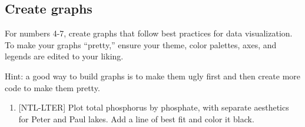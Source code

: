 \documentclass[]{article}
\newenvironment{Shaded}{\begin{snugshade}}{\end{snugshade}}
\newcommand{\KeywordTok}[1]{\textcolor[rgb]{0.13,0.29,0.53}{\textbf{#1}}}
\newcommand{\DataTypeTok}[1]{\textcolor[rgb]{0.13,0.29,0.53}{#1}}
\newcommand{\DecValTok}[1]{\textcolor[rgb]{0.00,0.00,0.81}{#1}}
\newcommand{\StringTok}[1]{\textcolor[rgb]{0.31,0.60,0.02}{#1}}
\newcommand{\CommentTok}[1]{\textcolor[rgb]{0.56,0.35,0.01}{\textit{#1}}}
\newcommand{\OperatorTok}[1]{\textcolor[rgb]{0.81,0.36,0.00}{\textbf{#1}}}
\newcommand{\NormalTok}[1]{#1}
\providecommand{\tightlist}{%
  \setlength{\itemsep}{0pt}\setlength{\parskip}{0pt}}
\begin{document}
\begin{Shaded}
\end{Shaded}

\subsection{Create graphs}\label{create-graphs}

For numbers 4-7, create graphs that follow best practices for data
visualization. To make your graphs ``pretty,'' ensure your theme, color
palettes, axes, and legends are edited to your liking.

Hint: a good way to build graphs is to make them ugly first and then
create more code to make them pretty.

\begin{enumerate}
\def\labelenumi{\arabic{enumi}.}
\setcounter{enumi}{3}
\tightlist
\item
  {[}NTL-LTER{]} Plot total phosphorus by phosphate, with separate
  aesthetics for Peter and Paul lakes. Add a line of best fit and color
  it black.
\end{enumerate}

\begin{Shaded}
\end{Shaded}
\end{document}
